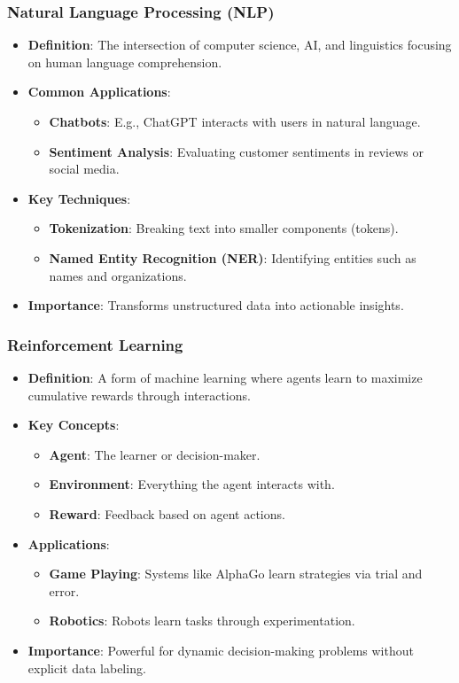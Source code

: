 \documentclass[aspectratio=169]{beamer}
\begin{document}
\begin{frame}[fragile]
    \frametitle{Natural Language Processing (NLP)}
    \begin{itemize}
        \item \textbf{Definition}: The intersection of computer science, AI, and linguistics focusing on human language comprehension.
        \item \textbf{Common Applications}:
            \begin{itemize}
                \item \textbf{Chatbots}: E.g., ChatGPT interacts with users in natural language.
                \item \textbf{Sentiment Analysis}: Evaluating customer sentiments in reviews or social media.
            \end{itemize}
        \item \textbf{Key Techniques}:
            \begin{itemize}
                \item \textbf{Tokenization}: Breaking text into smaller components (tokens).
                \item \textbf{Named Entity Recognition (NER)}: Identifying entities such as names and organizations.
            \end{itemize}
        \item \textbf{Importance}: Transforms unstructured data into actionable insights.
    \end{itemize}
\end{frame}

\begin{frame}[fragile]
    \frametitle{Reinforcement Learning}
    \begin{itemize}
        \item \textbf{Definition}: A form of machine learning where agents learn to maximize cumulative rewards through interactions.
        \item \textbf{Key Concepts}:
            \begin{itemize}
                \item \textbf{Agent}: The learner or decision-maker.
                \item \textbf{Environment}: Everything the agent interacts with.
                \item \textbf{Reward}: Feedback based on agent actions.
            \end{itemize}
        \item \textbf{Applications}:
            \begin{itemize}
                \item \textbf{Game Playing}: Systems like AlphaGo learn strategies via trial and error.
                \item \textbf{Robotics}: Robots learn tasks through experimentation.
            \end{itemize}
        \item \textbf{Importance}: Powerful for dynamic decision-making problems without explicit data labeling.
    \end{itemize}
\end{frame}
\end{document}
